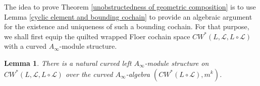 \documentclass{amsart}
\newtheorem{lemma}[theorem]{Lemma}
\numberwithin{equation}{section}
\numberwithin{figure}{section}
\begin{document}
	The idea to prove Theorem \ref{unobstructedness of geometric composition} is to use Lemma \ref{cyclic element and bounding cochain} to provide an algebraic argument for the existence and uniqueness of such a bounding cochain. For that purpose, we shall first equip the quilted wrapped Floer cochain space $CW^{*}(L, \mathcal{L}, L \circ \mathcal{L})$ with a curved $A_{\infty}$-module structure. \par

\begin{lemma}
	There is a natural curved left $A_{\infty}$-module structure on $CW^{*}(L, \mathcal{L}, L \circ \mathcal{L})$ over the curved $A_{\infty}$-algebra $(CW^{*}(L \circ \mathcal{L}), m^{k})$.
\end{lemma}
\end{document}
